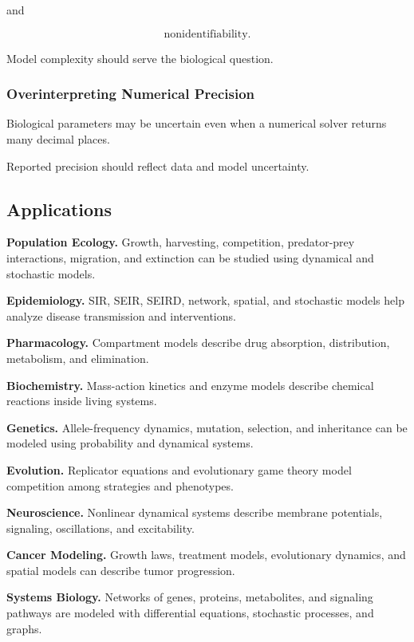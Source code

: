 and

\[
\boxed{
\text{nonidentifiability}.
}
\]

Model complexity should serve the biological question.

\subsubsection{Overinterpreting Numerical Precision}

Biological parameters may be uncertain even when a numerical solver returns
many decimal places.

Reported precision should reflect data and model uncertainty.

\subsection{Applications}
\label{subsec:mathematical-biology-applications}

\begin{applicationbox}

\textbf{Population Ecology.}
Growth, harvesting, competition, predator-prey interactions, migration, and
extinction can be studied using dynamical and stochastic models.

\medskip

\textbf{Epidemiology.}
SIR, SEIR, SEIRD, network, spatial, and stochastic models help analyze
disease transmission and interventions.

\medskip

\textbf{Pharmacology.}
Compartment models describe drug absorption, distribution, metabolism, and
elimination.

\medskip

\textbf{Biochemistry.}
Mass-action kinetics and enzyme models describe chemical reactions inside
living systems.

\medskip

\textbf{Genetics.}
Allele-frequency dynamics, mutation, selection, and inheritance can be
modeled using probability and dynamical systems.

\medskip

\textbf{Evolution.}
Replicator equations and evolutionary game theory model competition among
strategies and phenotypes.

\medskip

\textbf{Neuroscience.}
Nonlinear dynamical systems describe membrane potentials, signaling,
oscillations, and excitability.

\medskip

\textbf{Cancer Modeling.}
Growth laws, treatment models, evolutionary dynamics, and spatial models can
describe tumor progression.

\medskip

\textbf{Systems Biology.}
Networks of genes, proteins, metabolites, and signaling pathways are modeled
with differential equations, stochastic processes, and graphs.

\end{applicationbox}

